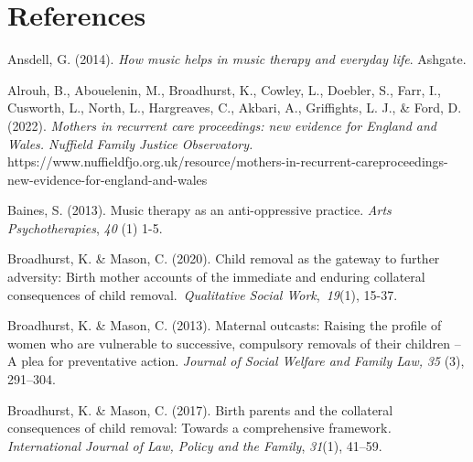 \documentclass[authordate, empirical]{jote-new-article}
\begin{document}
	\section{References}







	Ansdell, G. (2014). \emph{How music helps in music therapy and everyday life}. Ashgate.







	Alrouh, B., Abouelenin, M., Broadhurst, K., Cowley, L., Doebler, S., Farr, I., Cusworth, L., North, L., Hargreaves, C., Akbari, A., Griffights, L. J., \& Ford, D. (2022). \emph{Mothers in recurrent care proceedings: new evidence for England and Wales. Nuffield Family Justice Observatory.} https://www.nuffieldfjo.org.uk/resource/mothers-in-recurrent-careproceedings-new-evidence-for-england-and-wales







	Baines, S. (2013). Music therapy as an anti-oppressive practice. \emph{Arts Psychotherapies}, \emph{40} (1) 1-5.







	Broadhurst, K. \& Mason, C. (2020). Child removal as the gateway to further adversity: Birth mother accounts of the immediate and enduring collateral consequences of child removal. \emph{Qualitative Social Work}, \emph{19}(1), 15-37. 







	Broadhurst, K. \& Mason, C. (2013). Maternal outcasts: Raising the profile of women who are vulnerable to successive, compulsory removals of their children -- A plea for preventative action. \emph{Journal of Social Welfare and Family Law,} \emph{35 }(3), 291--304.







	Broadhurst, K. \& Mason, C. (2017). Birth parents and the collateral consequences of child removal: Towards a comprehensive framework\emph{. International Journal of Law, Policy and the Family},\emph{ 31}(1), 41--59.
\end{document}
